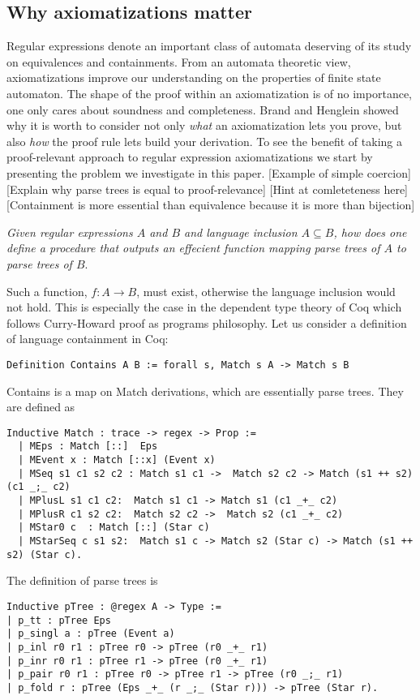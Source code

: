 \documentclass[a4paper,UKenglish,cleveref, autoref, thm-restate]{lipics-v2021}
\begin{document}
\subsection{Why axiomatizations matter}
Regular expressions denote an important class of automata deserving of its study on equivalences and containments. From an automata theoretic view, axiomatizations improve our understanding on the properties of finite state automaton. The shape of the proof within an axiomatization is of no importance, one only cares about soundness and completeness. Brand and Henglein showed why it is worth to consider not only \textit{what} an axiomatization lets you prove, but also \textit{how} the proof rule lets build your derivation. To see the benefit of taking a proof-relevant approach to regular expression axiomatizations we start by presenting the problem we investigate in this paper.
[Example of simple coercion]
[Explain why parse trees is equal to proof-relevance]
[Hint at comleteteness here]
[Containment is more essential than equivalence because it is more than bijection] 
\begin{center}
\textit{Given regular expressions $A$ and $B$ and language inclusion $A \subseteq  B$, how does one define a procedure that outputs an effecient function mapping parse trees of $A$ to parse trees of $B$}.\\
\end{center}
Such a function, $f : A \rightarrow B$, must exist, otherwise the language inclusion would not hold. This is especially the case in the dependent type theory of Coq which follows Curry-Howard proof as programs philosophy. Let us consider a definition of language containment in Coq:
\begin{verbatim}
Definition Contains A B := forall s, Match s A -> Match s B
\end{verbatim}
\textsf{Contains} is a map on \textsf{Match} derivations, which are essentially parse trees. 
They are defined as 
\begin{verbatim}
Inductive Match : trace -> regex -> Prop :=
  | MEps : Match [::]  Eps
  | MEvent x : Match [::x] (Event x)
  | MSeq s1 c1 s2 c2 : Match s1 c1 ->  Match s2 c2 -> Match (s1 ++ s2) (c1 _;_ c2)
  | MPlusL s1 c1 c2:  Match s1 c1 -> Match s1 (c1 _+_ c2)
  | MPlusR c1 s2 c2:  Match s2 c2 ->  Match s2 (c1 _+_ c2)
  | MStar0 c  : Match [::] (Star c)
  | MStarSeq c s1 s2:  Match s1 c -> Match s2 (Star c) -> Match (s1 ++ s2) (Star c).
\end{verbatim}
The definition of parse trees is
\begin{verbatim}
Inductive pTree : @regex A -> Type := 
| p_tt : pTree Eps 
| p_singl a : pTree (Event a)
| p_inl r0 r1 : pTree r0 -> pTree (r0 _+_ r1) 
| p_inr r0 r1 : pTree r1 -> pTree (r0 _+_ r1) 
| p_pair r0 r1 : pTree r0 -> pTree r1 -> pTree (r0 _;_ r1)
| p_fold r : pTree (Eps _+_ (r _;_ (Star r))) -> pTree (Star r).
\end{verbatim}
\end{document}
